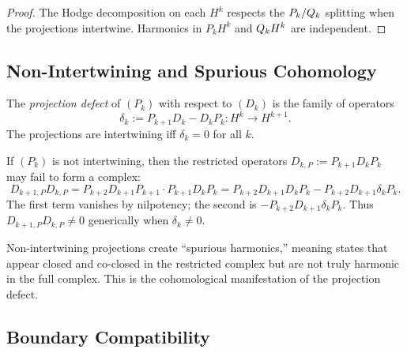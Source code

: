 \begin{proof}
The Hodge decomposition on each $H^k$ respects the $P_k / Q_k$ splitting when the projections intertwine.
Harmonics in $P_k H^k$ and $Q_k H^k$ are independent.
\end{proof}

\subsection{Non-Intertwining and Spurious Cohomology}
\label{subsec:spurious-cohomology}

\begin{definition}
\label{def:projection-defect-complex}
The \emph{projection defect} of $(P_k)$ with respect to $(D_k)$ is the family of operators
\[
\delta_k := P_{k+1} D_k - D_k P_k : H^k \to H^{k+1}.
\]
The projections are intertwining iff $\delta_k = 0$ for all $k$.
\end{definition}

\begin{proposition}
\label{prop:spurious-source}
If $(P_k)$ is not intertwining, then the restricted operators $D_{k,P} := P_{k+1} D_k P_k$ may fail to form a complex:
\[
D_{k+1,P} D_{k,P} = P_{k+2} D_{k+1} P_{k+1} \cdot P_{k+1} D_k P_k = P_{k+2} D_{k+1} D_k P_k - P_{k+2} D_{k+1} \delta_k P_k.
\]
The first term vanishes by nilpotency; the second is $-P_{k+2} D_{k+1} \delta_k P_k$.
Thus $D_{k+1,P} D_{k,P} \ne 0$ generically when $\delta_k \ne 0$.
\end{proposition}

\begin{remark}[Interpretation]
Non-intertwining projections create ``spurious harmonics,'' meaning states
that appear closed and co-closed in the restricted complex but are not truly
harmonic in the full complex.
This is the cohomological manifestation of the projection defect.
\end{remark}

\subsection{Boundary Compatibility}
\label{subsec:boundary-compatibility}

